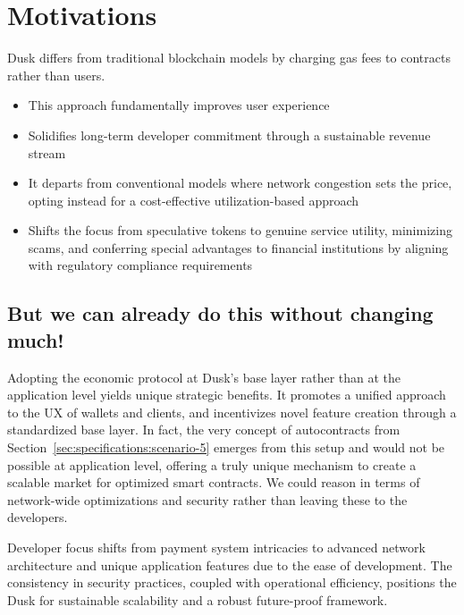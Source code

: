 \documentclass[twocolumn, nofootinbib]{revtex4-2} %
\begin{document}
    \section{Motivations}\label{sec:motivations}
    Dusk differs from traditional blockchain models by charging gas fees to
    contracts rather than users.

    \begin{itemize}
        \item This approach fundamentally improves user experience
        \item Solidifies long-term developer commitment through a sustainable
              revenue stream
        \item It departs from conventional models where network congestion sets
              the price, opting instead for a cost-effective utilization-based
              approach
        \item Shifts the focus from speculative tokens to genuine service
              utility, minimizing scams, and conferring special advantages to
              financial institutions by aligning with regulatory compliance
              requirements
    \end{itemize}

    \subsection{But we can already do this without changing much!}\label{sec:motivations:but-we-can-already-do-this}
    Adopting the economic protocol at Dusk's base layer rather than at the
    application level yields unique strategic benefits.
    It promotes a unified approach to the UX of wallets and clients, and
    incentivizes novel feature creation through a standardized base layer.
    In fact, the very concept of autocontracts from Section~\ref{sec:specifications:scenario-5} emerges
    from this setup and would not be possible at application level, offering a
    truly unique mechanism to create a scalable market for optimized smart
    contracts.
    We could reason in terms of network-wide optimizations and security rather
    than leaving these to the developers.

    Developer focus shifts from payment system intricacies to advanced network
    architecture and unique application features due to the ease of development.
    The consistency in security practices, coupled with operational efficiency,
    positions the Dusk for sustainable scalability and a robust future-proof
    framework.
\end{document}

